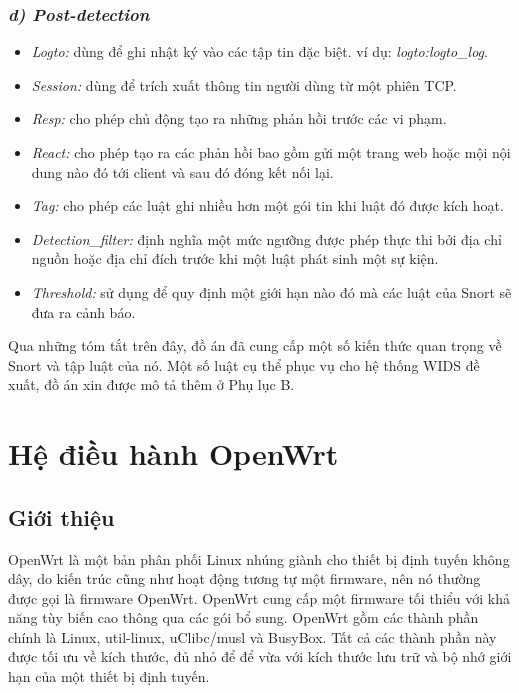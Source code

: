 \subsubsection*{\textit{d) Post-detection}}

\begin{itemize}
\item \emph{Logto:} dùng để ghi nhật ký vào các tập tin đặc biệt. ví dụ: \emph{logto:logto\_log}.
\item \emph{Session:} dùng để trích xuất thông tin người dùng từ một phiên TCP.
\item \emph{Resp:} cho phép chủ động tạo ra những phản hồi trước các vi phạm.
\item \emph{React:} cho phép tạo ra các phản hồi bao gồm gửi một trang web hoặc mội nội dung nào đó tới client và sau đó đóng kết nối lại.
\item \emph{Tag:} cho phép các luật ghi nhiều hơn một gói tin khi luật đó được kích hoạt.
\item \emph{Detection\_filter:} định nghĩa một mức ngưỡng được phép thực thi bởi địa chỉ nguồn hoặc địa chỉ đích trước khi một luật phát sinh một sự kiện.
\item \emph{Threshold:} sử dụng để quy định một giới hạn nào đó mà các luật của Snort sẽ đưa ra cảnh báo.
\end{itemize}

\begin{leftbar}
\noindent Qua những tóm tắt trên đây, đồ án đã cung cấp một số kiến thức quan trọng về Snort và tập luật của nó. Một số luật cụ thể phục vụ cho hệ thống WIDS đề xuất, đồ án xin được mô tả thêm ở Phụ lục B.
\end{leftbar}

\section{Hệ điều hành OpenWrt}
\subsection{Giới thiệu}
OpenWrt là một bản phân phối Linux nhúng giành cho thiết bị định tuyến không dây, do kiến trúc cũng như hoạt động tương tự một firmware, nên nó thường được gọi là firmware OpenWrt. OpenWrt cung cấp một firmware tối thiểu với khả năng tùy biến cao thông qua các gói bổ sung. OpenWrt gồm các thành phần chính là Linux, util-linux, uClibc/musl và BusyBox. Tất cả các thành phần này được tối ưu về kích thước, đủ nhỏ để để vừa với kích thước lưu trữ và bộ nhớ giới hạn của một thiết bị định tuyến.

